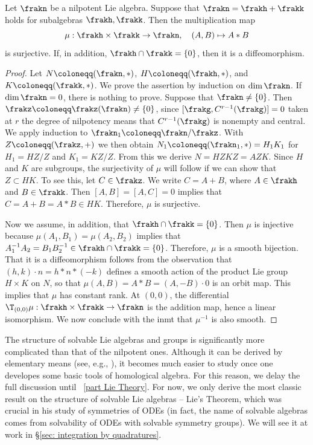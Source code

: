 \begin{lem}[{\cite[Lem.~11.2.13]{HN}}]
    Let $\frakn$ be a nilpotent Lie algebra. Suppose that $\frakn=\frakh+\frakk$ holds for subalgebras $\frakh,\frakk$. Then the multiplication map 
    \[\mu:\frakh\times\frakk\to\frakn,\quad (A,B)\mapsto A\ast B\]
    is surjective. If, in addition, $\frakh\cap\frakk=\{0\}$, then it is a diffeomorphism.
\end{lem}
\begin{proof}
    Let $N\coloneqq (\frakn,\ast)$, $H\coloneqq (\frakh,\ast)$, and $K\coloneqq (\frakk,\ast)$. We prove the assertion by induction on $\dim\frakn$. If $\dim\frakn=0$, there is nothing to prove. Suppose that $\frakn\neq\{0\}$. Then $\frakz\coloneqq\frakz(\frakn)\neq \{0\}$, since $[\frakg,C^{r-1}(\frakg)]=0$ taken at $r$ the degree of nilpotency means that $C^{r-1}(\frakg)$ is nonempty and central. We apply induction to $\frakn_1\coloneqq \frakn\slash\frakz$. With $Z\coloneqq (\frakz,+)$ we then obtain $N_1\coloneqq (\frakn_1,\ast)=H_1K_1$ for $H_1=HZ\slash Z$ and $K_1=KZ\slash Z$. From this we derive $N=HZKZ=AZK$. Since $H$ and $K$ are subgroups, the surjectivity of $\mu$ will follow if we can show that $Z\subset HK$. To see this, let $C\in\frakz$. We write $C=A+B$, where $A\in\frakh$ and $B\in\frakk$. Then $[A,B]=[A,C]=0$ implies that $C=A+B=A\ast B\in HK$. Therefore, $\mu$ is surjective.

    Now we assume, in addition, that $\frakh\cap\frakk=\{0\}$. Then $\mu$ is injective because $\mu(A_1,B_1)=\mu(A_2,B_2)$ implies that $A_1^{-1}A_2=B_1B_2^{-1}\in\frakh\cap\frakk=\{0\}$. Therefore, $\mu$ is a smooth bijection. That it is a diffeomorphism follows from the observation that $(h,k)\cdot n=h\ast n\ast(-k)$ defines a smooth action of the product Lie group $H\times K$ on $N$, so that $\mu(A,B)=A\ast B=(A,-B)\cdot 0$ is an orbit map. This implies that $\mu$ has constant rank. At $(0,0)$, the differential $\T_{(0,0)}\mu:\frakh\times\frakk\to \frakn$ is the addition map, hence a linear isomorphism. We now conclude with the \gls{inmt} that $\mu^{-1}$ is also smooth.
\end{proof}



\PRLsep 


The structure of solvable Lie algebras and groups is significantly more complicated than that of the nilpotent ones. Although it can be derived by elementary means (see, e.g., \cite{HN}), it becomes much easier to study once one developes some basic tools of homological algebra. For this reason, we delay the full discussion until \Part~\ref{part Lie Theory}. For now, we only derive the most classic result on the structure of solvable Lie algebras -- Lie's Theorem, which was crucial in his study of symmetries of ODEs (in fact, the name of solvable algebras comes from solvability of ODEs with solvable symmetry groups). We will see it at work in \S\ref{sec: integration by quadratures}.

